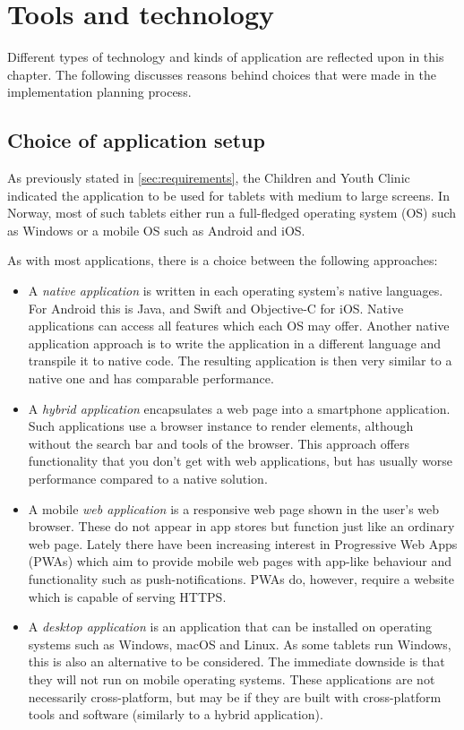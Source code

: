 \chapter{Tools and technology}
\label{ch:tools}

Different types of technology and kinds of application are reflected upon in this chapter. The following discusses reasons behind choices that were made in the implementation planning process.

\section{Choice of application setup}
\label{sec:appsetup}


As previously stated in \autoref{sec:requirements}, the Children and Youth Clinic indicated the application to be used for tablets with medium to large screens. In Norway, most of such tablets either run a full-fledged operating system (OS) such as Windows or a mobile OS such as Android and iOS. 

As with most applications, there is a choice between the following approaches:

\begin{itemize}
    \item A \emph{native application} is written in each operating system's native languages. For Android this is Java, and Swift and Objective-C for iOS. Native applications can access all features which each OS may offer. Another native application approach is to write the application in a different language and transpile it to native code. The resulting application is then very similar to a native one and has comparable performance.
    \item A \emph{hybrid application} encapsulates a web page into a smartphone application. Such applications use a browser instance to render elements, although without the search bar and tools of the browser. This approach offers functionality that you don't get with web applications, but has usually worse performance compared to a native solution.
    \item A mobile \emph{web application} is a responsive web page shown in the user's web browser. These do not appear in app stores but function just like an ordinary web page. Lately there have been increasing interest in Progressive Web Apps (PWAs) which aim to provide mobile web pages with app-like behaviour and functionality such as push-notifications. PWAs do, however, require a website which is capable of serving HTTPS.
    \item A \emph{desktop application} is an application that can be installed on operating systems such as Windows, macOS and Linux. As some tablets run Windows, this is also an alternative to be considered. The immediate downside is that they will not run on mobile operating systems. These applications are not necessarily cross-platform, but may be if they are built with cross-platform tools and software (similarly to a hybrid application).
\end{itemize}

